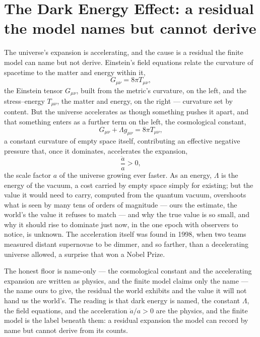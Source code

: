\section{The Dark Energy Effect: a residual the model names but cannot derive}
\label{se:dark-energy}

The universe's expansion is accelerating, and the cause is a residual the finite model can name but not derive.
Einstein's field equations relate the curvature of spacetime to the matter and energy within it,
\begin{equation}
  G_{\mu\nu} = 8\pi T_{\mu\nu},
\end{equation}
the Einstein tensor $G_{\mu\nu}$, built from the metric's curvature, on the left, and the stress--energy
$T_{\mu\nu}$, the matter and energy, on the right --- curvature set by content. But the universe accelerates as
though something pushes it apart, and that something enters as a further term on the left, the cosmological
constant,
\begin{equation}
  G_{\mu\nu} + \Lambda g_{\mu\nu} = 8\pi T_{\mu\nu},
\end{equation}
a constant curvature of empty space itself, contributing an effective negative pressure that, once it
dominates, accelerates the expansion,
\begin{equation}
  \frac{\ddot a}{a} > 0,
\end{equation}
the scale factor $a$ of the universe growing ever faster. As an energy, $\Lambda$ is the energy of the
vacuum, a cost carried by empty space simply for existing; but the value it would need to carry, computed from
the quantum vacuum, overshoots what is seen by many tens of orders of magnitude --- ours the estimate, the
world's the value it refuses to match --- and why the true value is so small, and why it should rise to dominate
just now, in the one epoch with observers to notice, is unknown.
The acceleration itself was found in 1998, when two teams measured distant supernovae to be dimmer, and so
farther, than a decelerating universe allowed, a surprise that won a Nobel Prize.

The honest floor is name-only --- the cosmological constant and the accelerating expansion are written as
physics, and the finite model claims only the name --- the name ours to give, the residual the world exhibits
and the value it will not hand us the world's. The reading is that dark energy is named, the constant
$\Lambda$, the field equations, and the acceleration $\ddot a/a > 0$ are the physics, and the finite model is
the label beneath them: a residual expansion the model can record by name but cannot derive from its counts.

